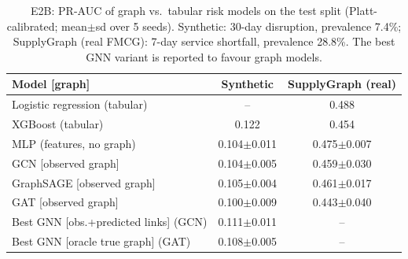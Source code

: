 \begin{table}[t]\centering\caption{E2B: PR-AUC of graph vs.\ tabular risk models on the test split (Platt-calibrated; mean$\pm$sd over 5 seeds). Synthetic: 30-day disruption, prevalence 7.4\%; SupplyGraph (real FMCG): 7-day service shortfall, prevalence 28.8\%. The best GNN variant is reported to favour graph models.}\label{tab:exp2b}\scriptsize\setlength{\tabcolsep}{3pt}\begin{tabular}{lcc}\toprule
Model [graph] & Synthetic & SupplyGraph (real)\\\midrule
Logistic regression (tabular) & -- & 0.488\\
XGBoost (tabular) & 0.122 & 0.454\\
MLP (features, no graph) & 0.104$\pm$0.011 & 0.475$\pm$0.007\\
GCN [observed graph] & 0.104$\pm$0.005 & 0.459$\pm$0.030\\
GraphSAGE [observed graph] & 0.105$\pm$0.004 & 0.461$\pm$0.017\\
GAT [observed graph] & 0.100$\pm$0.009 & 0.443$\pm$0.040\\
Best GNN [obs.+predicted links] (GCN) & 0.111$\pm$0.011 & --\\
Best GNN [oracle true graph] (GAT) & 0.108$\pm$0.005 & --\\
\bottomrule\end{tabular}\end{table}
